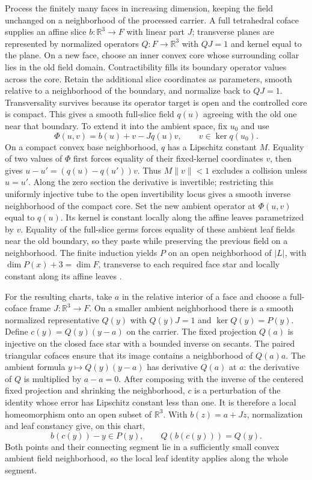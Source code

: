 Process the finitely many faces in increasing dimension, keeping the
field unchanged on a neighborhood of the processed carrier. A full
tetrahedral coface supplies an affine slice $b:\mathbb R^3\to F$ with
linear part $J$; transverse planes are represented by normalized
operators $Q:F\to\mathbb R^3$ with $QJ=1$ and kernel equal to the
plane. On a new face, choose an inner convex core whose surrounding
collar lies in the old field domain. Contractibility fills its boundary
operator values across the core. Retain the additional slice coordinates
as parameters, smooth relative to a neighborhood of the boundary, and
normalize back to $QJ=1$. Transversality survives because its operator
target is open and the controlled core is compact. This gives a smooth
full-slice field $q(u)$ agreeing with the old one near that boundary.
To extend it into the ambient space, fix $u_0$ and use
\[
 \Phi(u,v)=b(u)+v-Jq(u)v,\qquad v\in\ker q(u_0).
\]
On a compact convex base neighborhood, $q$ has a Lipschitz constant
$M$. Equality of two values of $\Phi$ first forces equality of their
fixed-kernel coordinates $v$, then gives
$u-u'=(q(u)-q(u'))v$. Thus $M\|v\|<1$ excludes a collision unless
$u=u'$. Along the zero section the derivative is invertible;
restricting this uniformly injective tube to the open invertibility
locus gives a smooth inverse neighborhood of the compact core. Set the new
ambient operator at $\Phi(u,v)$ equal to $q(u)$. Its kernel is constant
locally along the affine leaves parametrized by $v$. Equality of the
full-slice germs forces equality of these ambient leaf fields near the
old boundary, so they paste while preserving the previous field on a
neighborhood. The finite induction yields $P$ on an open neighborhood
of $|L|$, with $\dim P(x)+3=\dim F$, transverse to each required
face star and locally constant along its affine leaves
\cite[Sections 7--8, pp.~803--805]{Cairns1940}.

For the resulting charts, take $a$ in the relative interior of a face
and choose a full-coface frame $J:\mathbb R^3\to F$. On a smaller
ambient neighborhood there is a smooth normalized representative
$Q(y)$ with $Q(y)J=1$ and $\ker Q(y)=P(y)$. Define
$c(y)=Q(y)(y-a)$ on the carrier. The fixed projection $Q(a)$ is
injective on the closed face star with a bounded inverse on secants.
The paired triangular cofaces ensure that its image contains a
neighborhood of $Q(a)a$. The ambient formula $y\mapsto Q(y)(y-a)$
has derivative $Q(a)$ at $a$: the derivative of $Q$ is multiplied
by $a-a=0$. After composing with the inverse of the centered fixed
projection and shrinking the neighborhood, $c$ is a
perturbation of the identity whose error has Lipschitz constant less
than one. It is therefore a local homeomorphism onto an open subset
of $\mathbb R^3$. With $b(z)=a+Jz$, normalization and leaf constancy
give, on this chart,
\[
 b(c(y))-y\in P(y),\qquad Q(b(c(y)))=Q(y).
\]
Both points and their connecting segment lie in a sufficiently small
convex ambient field neighborhood, so the local leaf identity applies
along the whole segment.

